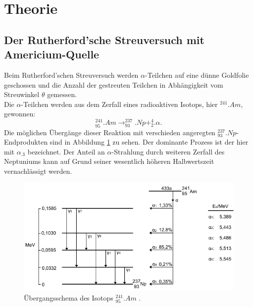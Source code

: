 \section{Theorie}
\label{sec:Theorie}

\subsection{Der Rutherford'sche Streuversuch mit Americium-Quelle}
Beim Rutherford'schen Streuversuch werden $\alpha$-Teilchen auf eine dünne Goldfolie geschossen und die Anzahl der gestreuten Teilchen in Abhängigkeit vom Streuwinkel $\theta$ gemessen.\\
Die $\alpha$-Teilchen werden aus dem Zerfall eines radioaktiven Isotops, hier $^{241}.{Am}$, gewonnen:
\[
^{241}_{95}.{Am}\rightarrow ^{237}_{93}.{Np} + ^{4}_{2}.{\alpha}\text{.}
\]
Die möglichen Übergänge dieser Reaktion mit verschieden angeregten $^{237}_{93}.{Np}$-Endprodukten sind in Abbildung \ref{fig:uebergang} zu sehen. Der dominante Prozess ist der hier mit $\alpha_.3$ bezeichnet. Der Anteil an $\alpha$-Strahlung durch weiteren Zerfall des Neptuniums kann auf Grund seiner wesentlich höheren Halbwertszeit vernachlässigt werden.\\
\begin{figure}
\centering
\includegraphics[width=\linewidth-60pt,keepaspectratio]{content/images/uebergang.pdf}
\caption{Übergangsschema des Isotops $^{241}_{95}.{Am}$ \cite{Schema16}.}
\label{fig:uebergang}
\end{figure}

